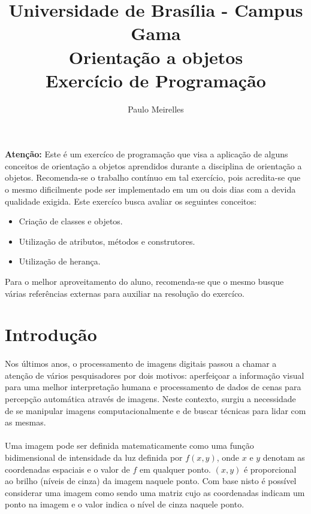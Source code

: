 \documentclass[a4paper,10pt]{article}
\title{ \textbf{Universidade de Brasília - Campus Gama \\ 
        Orientação a objetos \\ Exercício de Programação }}
\date{}
\author{Paulo Meirelles}
\begin{document}
\maketitle

\paragraph{}
\textbf{Atenção:} Este é um exercíco de programação que visa a aplicação de 
  alguns conceitos de orientação a objetos aprendidos durante a disciplina de 
  orientação a objetos. Recomenda-se o trabalho contínuo em tal exercício, pois
  acredita-se que o mesmo dificilmente pode ser implementado em um ou dois dias
  com a devida qualidade exigida. Este exercíco busca avaliar os seguintes
  conceitos:

\begin{itemize}
 \item Criação de classes e objetos.
 \item Utilização de atributos, métodos e construtores. 
 \item Utilização de herança.
\end{itemize}

Para o melhor aproveitamento do aluno, recomenda-se que o mesmo busque várias
referências externas para auxiliar na resolução do exercíco.

\section{Introdução}

\paragraph{}
Nos últimos anos, o processamento de imagens digitais passou a chamar a atenção
de vários pesquisadores por dois motivos: aperfeiçoar a informação visual para
uma melhor interpretação humana e processamento de dados de cenas para
percepção automática através de imagens. Neste contexto, surgiu a
necessidade de se manipular imagens computacionalmente e de buscar técnicas
para lidar com as mesmas.

\paragraph{}
Uma imagem pode ser definida matematicamente como uma função bidimensional de
intensidade da luz definida por $f(x, y)$, onde $x$ e $y$ denotam as 
coordenadas espaciais e o valor de $f$ em qualquer ponto. $(x,y)$ é
proporcional ao brilho (níveis de cinza) da imagem naquele ponto. Com 
base nisto é possível considerar uma imagem como sendo uma matriz cujo as 
coordenadas indicam um ponto na imagem e o valor indica o nível de cinza 
naquele ponto.
\end{document}
